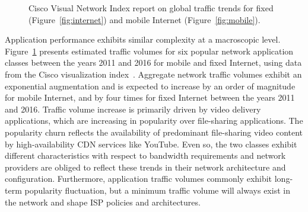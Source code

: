\begin{figure}[] 
  \caption[Cisco Visual Network Index report on global traffic trends]{Cisco
    Visual Network Index report on global traffic trends
    for fixed (Figure~\ref{fig:internet}) and mobile Internet (Figure~\ref{fig:mobile}).}
  \label{fig:internet_applications} 
\end{figure}

Application performance exhibits similar complexity at a macroscopic level.
Figure~\ref{fig:internet_applications} presents estimated traffic volumes for
six popular network application classes between the years 2011 and 2016 for mobile
and fixed Internet, using data from the Cisco visualization
index~. Aggregate network traffic volumes
exhibit an exponential augmentation and is expected to increase by an order of
magnitude for mobile Internet, and by four times for fixed Internet between the
years 2011 and 2016. Traffic volume increase is primarily driven by video
delivery applications, which are increasing in popularity over file-sharing
applications. The popularity churn reflects the availability of predominant
file-sharing video content by high-availability CDN services like YouTube.
Even so, the two classes exhibit different characteristics with respect to
bandwidth requirements and network providers are obliged to reflect these
trends in their network architecture and configuration. Furthermore,
application traffic volumes commonly exhibit long-term popularity fluctuation,
but a minimum traffic volume will always exist in the network and shape ISP
policies and architectures. 

